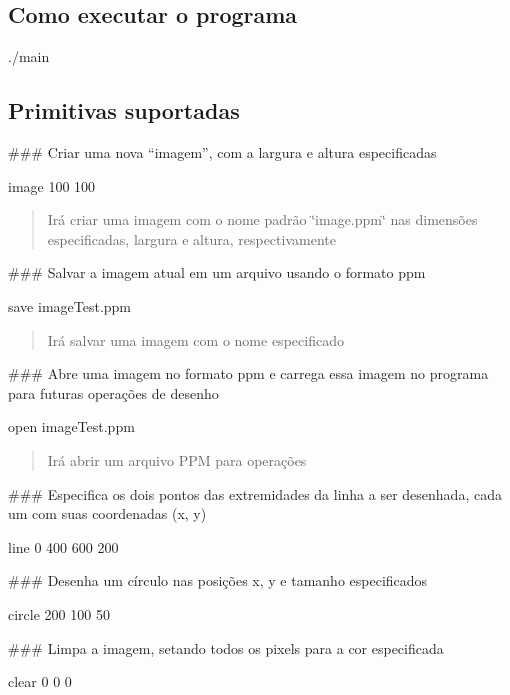 \subsection*{Como executar o programa}


\begin{DoxyCode}
./main
\end{DoxyCode}


\subsection*{Primitivas suportadas}

\#\#\# Criar uma nova “imagem”, com a largura e altura especificadas 
\begin{DoxyCode}
image 100 100
\end{DoxyCode}
 \begin{quote}
Irá criar uma imagem com o nome padrão \char`\"{}image.\+ppm\char`\"{} nas dimensões especificadas, largura e altura, respectivamente \end{quote}


\#\#\# Salvar a imagem atual em um arquivo usando o formato ppm 
\begin{DoxyCode}
save imageTest.ppm
\end{DoxyCode}
 \begin{quote}
Irá salvar uma imagem com o nome especificado \end{quote}


\#\#\# Abre uma imagem no formato ppm e carrega essa imagem no programa para futuras operações de desenho 
\begin{DoxyCode}
open imageTest.ppm
\end{DoxyCode}
 \begin{quote}
Irá abrir um arquivo P\+PM para operações \end{quote}


\#\#\# Especifica os dois pontos das extremidades da linha a ser desenhada, cada um com suas coordenadas (x, y) 
\begin{DoxyCode}
line 0 400 600 200
\end{DoxyCode}


\#\#\# Desenha um círculo nas posições x, y e tamanho especificados 
\begin{DoxyCode}
circle 200 100 50
\end{DoxyCode}


\#\#\# Limpa a imagem, setando todos os pixels para a cor especificada 
\begin{DoxyCode}
clear 0 0 0
\end{DoxyCode}


